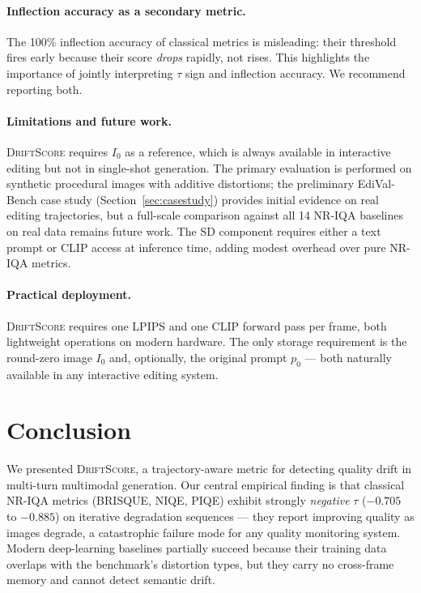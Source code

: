 \documentclass[sigconf]{acmart}
\newcommand{\DS}{\textsc{DriftScore}}
\newcommand{\Izero}{\ensuremath{I_0}}
\newcommand{\pzero}{\ensuremath{p_0}}
\begin{document}
\paragraph{Inflection accuracy as a secondary metric.}
The 100\% inflection accuracy of classical metrics is misleading: their
threshold fires early because their score \emph{drops} rapidly, not rises.
This highlights the importance of jointly interpreting $\tau$ sign and
inflection accuracy. We recommend reporting both.

\paragraph{Limitations and future work.}
\DS{} requires $\Izero$ as a reference, which is always available in
interactive editing but not in single-shot generation.
The primary evaluation is performed on synthetic procedural images with
additive distortions; the preliminary EdiVal-Bench case study
(Section~\ref{sec:casestudy}) provides initial evidence on real editing
trajectories, but a full-scale comparison against all 14 NR-IQA baselines
on real data remains future work.
The SD component requires either a text prompt or CLIP access at inference
time, adding modest overhead over pure NR-IQA metrics.

\paragraph{Practical deployment.}
\DS{} requires one LPIPS and one CLIP forward pass per frame,
both lightweight operations on modern hardware.
The only storage requirement is the round-zero image $\Izero$ and,
optionally, the original prompt $\pzero$ --- both naturally available
in any interactive editing system.

\section{Conclusion}
\label{sec:conclusion}

We presented \DS{}, a trajectory-aware metric for detecting quality drift
in multi-turn multimodal generation.
Our central empirical finding is that classical NR-IQA metrics
(BRISQUE, NIQE, PIQE) exhibit strongly \emph{negative} $\tau$
($-0.705$ to $-0.885$) on iterative degradation sequences ---
they report improving quality as images degrade, a catastrophic failure
mode for any quality monitoring system.
Modern deep-learning baselines partially succeed because their training
data overlaps with the benchmark's distortion types, but they carry no
cross-frame memory and cannot detect semantic drift.
\end{document}
